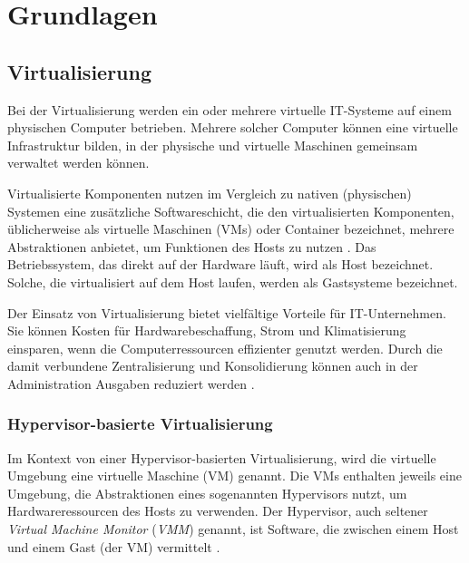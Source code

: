 \documentclass[../main.tex]{subfiles}
\begin{document}
\chapter{Grundlagen}
\label{basics}

	\section{Virtualisierung}
  \label{introVirt}
    Bei der Virtualisierung werden ein oder mehrere virtuelle IT-Systeme auf einem physischen Computer betrieben. Mehrere solcher Computer können eine virtuelle Infrastruktur bilden, in der physische und virtuelle Maschinen gemeinsam verwaltet werden können.

		Virtualisierte Komponenten nutzen im Vergleich zu nativen (physischen) Systemen eine zusätzliche Softwareschicht, die den virtualisierten Komponenten, üblicherweise als virtuelle Maschinen (VMs) oder Container bezeichnet, mehrere Abstraktionen anbietet, um Funktionen des Hosts zu nutzen \cite[S.2]{containerVirtPerformance}. Das Betriebssystem, das direkt auf der Hardware läuft, wird als Host bezeichnet. Solche, die virtualisiert auf dem Host laufen, werden als Gastsysteme bezeichnet.

    Der Einsatz von Virtualisierung bietet vielfältige Vorteile für IT-Unternehmen. Sie können Kosten für Hardwarebeschaffung, Strom und Klimatisierung einsparen, wenn die Computerressourcen effizienter genutzt werden. Durch die damit verbundene Zentralisierung und Konsolidierung können auch in der Administration Ausgaben reduziert werden  \cite[S.1]{bsiVirt}.

    \subsection{Hypervisor-basierte Virtualisierung}
    \label{introVirtHypervisor}
      Im Kontext von einer Hypervisor-basierten Virtualisierung, wird die virtuelle Umgebung eine virtuelle Maschine (VM) genannt. Die VMs enthalten jeweils eine Umgebung, die Abstraktionen eines sogenannten Hypervisors nutzt, um Hardwareressourcen des Hosts zu verwenden. Der Hypervisor, auch seltener \emph{Virtual Machine Monitor} (\emph{VMM}) genannt, ist Software, die zwischen einem Host und einem Gast (der VM) vermittelt \cite[S.6]{dockerBook}\cite[S.2]{containerVirtPerformance}\cite[S.2]{dockerSec1}.

\end{document}
